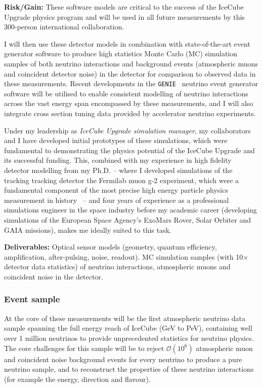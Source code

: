 \documentclass[a4paper,11pt]{article}
\newcounter{bar}
\begin{document}

\textbf{Risk/Gain:} These software models are critical to the success of the IceCube Upgrade physics program and will be used in all future measurements by this 300-person international collaboration.

I will then use these detector models in combination with state-of-the-art event generator software to produce high statistics Monte Carlo (MC) simulation samples of both neutrino interactions and background events (atmospheric muons and coincident detector noise) in the detector for comparison to observed data in these measurements. Recent developments in the \texttt{GENIE}~\cite{Andreopoulos:2009zz, Garcia:2019hze} neutrino event generator software will be utilised to enable consistent modelling of neutrino interactions across the vast energy span encompassed by these measurements, and I will also integrate cross section tuning data provided by accelerator neutrino experiments. 

Under my leadership as \textit{IceCube Upgrade simulation manager}, my collaborators and I have developed initial prototypes of these simulations, which were fundamental to demonstrating the physics potential of the IceCube Upgrade and its successful funding. This, combined with my experience in high fidelity detector modelling from my Ph.D. -- where I developed simulations of the tracking tracking detector the Fermilab muon g-2 experiment, which were a fundamental component of the most precise high energy particle physics measurement in history~\cite{gm2_run1_result} -- and four years of experience as a professional simulations engineer in the space industry before my academic career (developing simulations of the European Space Agency's ExoMars Rover, Solar Orbiter and GAIA missions), makes me ideally suited to this task. 

\textbf{Deliverables:} Optical sensor models (geometry, quantum efficiency, amplification, after-pulsing, noise, readout). MC simulation samples (with 10$\times$ detector data statistics) of neutrino interactions, atmospheric muons and coincident noise in the detector. \\


\subsubsection{Event sample}

At the core of these measurements will be the first atmospheric neutrino data sample spanning the full energy reach of IceCube (GeV to PeV), containing well over 1 million neutrinos to provide unprecedented statistics for neutrino physics. The core challenges for this sample will be to reject $\mathcal{O}(10^6)$ atmospheric muon and coincident noise background events for every neutrino to produce a pure neutrino sample, and to reconstruct the properties of these neutrino interactions (for example the energy, direction and flavour). 
\end{document}
